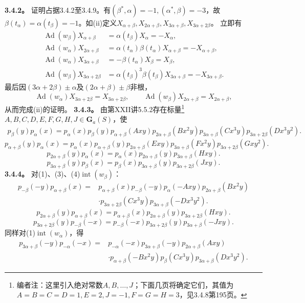 \textbf{3.4.2。} 证明占据3.4.2至3.4.9。有$(\beta^*,\alpha)=-1,(\alpha^*,\beta)=-3$，故$\beta(t_\alpha)=\alpha(t_\beta)=-1$。如(ii)定义$X_{\alpha+\beta},X_{2\alpha+\beta},X_{3\alpha+\beta},X_{3\alpha+2\beta}$。
立即有
\[\begin{aligned}\operatorname{Ad}(w_\beta)X_{\alpha+\beta}&=\alpha(t_\beta)X_\alpha=-X_\alpha,\\\operatorname{Ad}(w_\alpha)X_{2\alpha+\beta}&=\alpha(t_\alpha)\beta(t_\alpha)X_{\alpha+\beta}=-X_{\alpha+\beta},\\\operatorname{Ad}(w_\alpha)X_{3\alpha+\beta}&=-\beta(t_\alpha)X_\beta=X_\beta,\\\operatorname{Ad}(w_\beta)X_{3\alpha+2\beta}&=\alpha(t_\beta)^3\beta(t_\beta)X_{3\alpha+\beta}=-X_{3\alpha+\beta}.\end{aligned}\]
最后因$(3\alpha+2\beta)\pm\alpha$及$(2\alpha+\beta)\pm\beta$非根，
\[\operatorname{Ad}(w_\alpha)X_{3\alpha+2\beta}=X_{3\alpha+2\beta},\qquad\operatorname{Ad}(w_\beta)X_{2\alpha+\beta}=X_{2\alpha+\beta},\]
从而完成(ii)的证明。
\textbf{3.4.3。} 由第XXII讲5.5.2存在标量\footnote{编者注：这里引入绝对常数$A,B,\ldots,J$；下面几页将确定它们，其值为$A=B=C=D=1,E=2,J=-1,F=G=H=3$，见3.4.8第195页。}$A,B,C,D,E,F,G,H,J\in\mathbf G_a(S)$，使
\[\begin{aligned}p_\beta(y)p_\alpha(x)=p_\alpha(x)p_\beta(y)p_{\alpha+\beta}(Axy)p_{2\alpha+\beta}(Bx^2y)p_{3\alpha+\beta}(Cx^3y)p_{3\alpha+2\beta}(Dx^3y^2).\end{aligned}\tag{1}\]
\[p_{\alpha+\beta}(y)p_\alpha(x)=p_\alpha(x)p_{\alpha+\beta}(y)p_{2\alpha+\beta}(Exy)p_{3\alpha+\beta}(Fx^2y)p_{3\alpha+2\beta}(Gxy^2).\tag{2}\]
\[p_{2\alpha+\beta}(y)p_\alpha(x)=p_\alpha(x)p_{2\alpha+\beta}(y)p_{3\alpha+\beta}(Hxy).\tag{3}\]
\[p_{3\alpha+\beta}(y)p_\beta(x)=p_\beta(x)p_{3\alpha+\beta}(y)p_{3\alpha+2\beta}(Jxy).\tag{4}\]
\textbf{3.4.4。} 对(1)、(3)、(4)$\operatorname{int}(w_\beta)$：
\[\begin{aligned}p_{-\beta}(-y)p_{\alpha+\beta}(x)={}&p_{\alpha+\beta}(x)p_{-\beta}(-y)p_\alpha(-Axy)p_{2\alpha+\beta}(Bx^2y)\\&\cdot p_{3\alpha+2\beta}(Cx^3y)p_{3\alpha+\beta}(-Dx^3y^2).\end{aligned}\tag{5}\]
\[p_{2\alpha+\beta}(y)p_{\alpha+\beta}(x)=p_{\alpha+\beta}(x)p_{2\alpha+\beta}(y)p_{3\alpha+2\beta}(Hxy).\tag{6}\]
\[p_{3\alpha+2\beta}(y)p_{-\beta}(-x)=p_{-\beta}(-x)p_{3\alpha+2\beta}(y)p_{3\alpha+\beta}(-Jxy).\tag{7}\]
同样对(1)$\operatorname{int}(w_\alpha)$，得
\[\begin{aligned}p_{3\alpha+\beta}(-y)p_{-\alpha}(-x)={}&p_{-\alpha}(-x)p_{3\alpha+\beta}(-y)p_{2\alpha+\beta}(Axy)\\&\cdot p_{\alpha+\beta}(-Bx^2y)p_\beta(Cx^3y)p_{3\alpha+\beta}(Dx^3y^2).\end{aligned}\tag{8}\]
